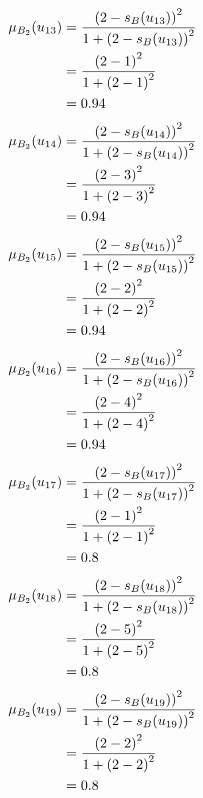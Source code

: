 \documentclass[a4paper]{book}
\begin{document}
				\begin{align}
					\mu_{B_2}(u_{13}) &= \frac{\left(2-s_B(u_{13})\right)^2}{1 + \left(2-s_B(u_{13})\right)^2}\\
					&= \frac{\left(2-1\right)^2}{1 + \left(2-1\right)^2} \notag \\
					&= 0.94 \notag
				\end{align}
				\begin{align}
					\mu_{B_2}(u_{14}) &= \frac{\left(2-s_B(u_{14})\right)^2}{1 + \left(2-s_B(u_{14})\right)^2}\\
					&= \frac{\left(2-3\right)^2}{1 + \left(2-3\right)^2} \notag \\
					&= 0.94 \notag
				\end{align}
				\begin{align}
					\mu_{B_2}(u_{15}) &= \frac{\left(2-s_B(u_{15})\right)^2}{1 + \left(2-s_B(u_{15})\right)^2}\\
					&= \frac{\left(2-2\right)^2}{1 + \left(2-2\right)^2} \notag \\
					&= 0.94 \notag
				\end{align}
				\begin{align}
					\mu_{B_2}(u_{16}) &= \frac{\left(2-s_B(u_{16})\right)^2}{1 + \left(2-s_B(u_{16})\right)^2}\\
					&= \frac{\left(2-4\right)^2}{1 + \left(2-4\right)^2} \notag \\
					&= 0.94 \notag
				\end{align}
				\begin{align}
					\mu_{B_2}(u_{17}) &= \frac{\left(2-s_B(u_{17})\right)^2}{1 + \left(2-s_B(u_{17})\right)^2}\\
					&= \frac{\left(2-1\right)^2}{1 + \left(2-1\right)^2} \notag \\
					&= 0.8 \notag
				\end{align}
				\begin{align}
					\mu_{B_2}(u_{18}) &= \frac{\left(2-s_B(u_{18})\right)^2}{1 + \left(2-s_B(u_{18})\right)^2}\\
					&= \frac{\left(2-5\right)^2}{1 + \left(2-5\right)^2} \notag \\
					&= 0.8 \notag
				\end{align}
				\begin{align}
					\mu_{B_2}(u_{19}) &= \frac{\left(2-s_B(u_{19})\right)^2}{1 + \left(2-s_B(u_{19})\right)^2}\\
					&= \frac{\left(2-2\right)^2}{1 + \left(2-2\right)^2} \notag \\
					&= 0.8 \notag
				\end{align}
\end{document}
